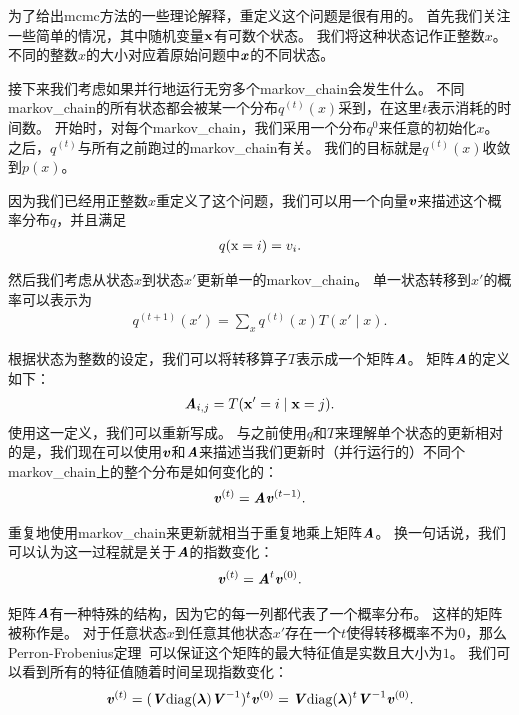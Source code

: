 为了给出\gls{mcmc}方法的一些理论解释，重定义这个问题是很有用的。
首先我们关注一些简单的情况，其中随机变量$\mathbf{x}$有可数个状态。
我们将这种状态记作正整数$x$。
不同的整数$x$的大小对应着原始问题中$\boldsymbol{\mathit{x}}$的不同状态。


接下来我们考虑如果并行地运行无穷多个\gls{markov_chain}会发生什么。
不同\gls{markov_chain}的所有状态都会被某一个分布$q^{(t)}(x)$采到，在这里$t$表示消耗的时间数。
开始时，对每个\gls{markov_chain}，我们采用一个分布$q^{{0}}$来任意的初始化$x$。
之后，$q^{(t)}$与所有之前跑过的\gls{markov_chain}有关。
我们的目标就是$q^{(t)}(x)$收敛到$p(x)$。

因为我们已经用正整数$x$重定义了这个问题，我们可以用一个向量$\boldsymbol{\mathit{v}}$来描述这个概率分布$q$，并且满足
\begin{align}
q(\mathrm{x} = i) = v_i.
\end{align}

然后我们考虑从状态$x$到状态$x'$更新单一的\gls{markov_chain}。
单一状态转移到$x'$的概率可以表示为
\begin{align}
\label{eqn:transition1}
q^{(t+1)}(x') = \sum_{x} q^{(t)}(x) T(x'\mid x).
\end{align}


根据状态为整数的设定，我们可以将转移算子$T$表示成一个矩阵$\boldsymbol{\mathit{A}}$。
矩阵$\boldsymbol{\mathit{A}}$的定义如下：
\begin{align}
\boldsymbol{\mathit{A}}_{i,j} = T(\mathbf{x}' = i\mid \mathbf{x} = j).
\end{align}
使用这一定义，我们可以重新写成。
与之前使用$q$和$T$来理解单个状态的更新相对的是，我们现在可以使用$\boldsymbol{\mathit{v}}$和$\boldsymbol{\mathit{A}}$来描述当我们更新时（并行运行的）不同个\gls{markov_chain}上的整个分布是如何变化的：
\begin{align}
\boldsymbol{\mathit{v}}^{(t)} = \boldsymbol{\mathit{A}} \boldsymbol{\mathit{v}}^{(t-1)}.
\end{align}

重复地使用\gls{markov_chain}来更新就相当于重复地乘上矩阵$\boldsymbol{\mathit{A}}$。
换一句话说，我们可以认为这一过程就是关于$\boldsymbol{\mathit{A}}$的指数变化：
\begin{align}
\boldsymbol{\mathit{v}}^{(t)} = \boldsymbol{\mathit{A}}^{t} \boldsymbol{\mathit{v}}^{(0)}.
\end{align}

矩阵$\boldsymbol{\mathit{A}}$有一种特殊的结构，因为它的每一列都代表了一个概率分布。
这样的矩阵被称作是。
对于任意状态$x$到任意其他状态$x'$存在一个$t$使得转移概率不为$0$，那么Perron-Frobenius定理~\citep{perron1907theorie,frobenius1908matrizen}可以保证这个矩阵的最大特征值是实数且大小为$1$。
我们可以看到所有的特征值随着时间呈现指数变化：
\begin{align}
\boldsymbol{\mathit{v}}^{(t)} = (\boldsymbol{\mathit{V}} \text{diag}(\boldsymbol{\lambda})\boldsymbol{\mathit{V}}^{-1})^{t} \boldsymbol{\mathit{v}}^{(0)} = \boldsymbol{\mathit{V}} \text{diag}(\boldsymbol{\lambda})^t \boldsymbol{\mathit{V}}^{-1} \boldsymbol{\mathit{v}}^{(0)}.
\end{align}


